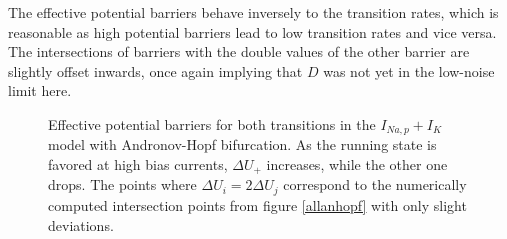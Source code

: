 \documentclass[12pt,a4paper]{article}
\begin{document}
The effective potential barriers behave inversely to the transition rates, which is reasonable as high potential barriers lead to low transition rates and vice versa. The intersections of barriers with the double values of the other barrier are slightly offset inwards, once again implying that $D$ was not yet in the low-noise limit here. 
\begin{figure}[H]
	\hspace*{-0.5cm}
	\caption{Effective potential barriers for both transitions in the $I_{Na,p}+I_K$ model with Andronov-Hopf bifurcation. As the running state is favored at high bias currents, $\Delta U_+$ increases, while the other one drops. The points where $\Delta U_i=2\Delta U_j$ correspond to the numerically computed intersection points from figure \ref{allanhopf} with only slight deviations.}
\end{figure}
\end{document}
